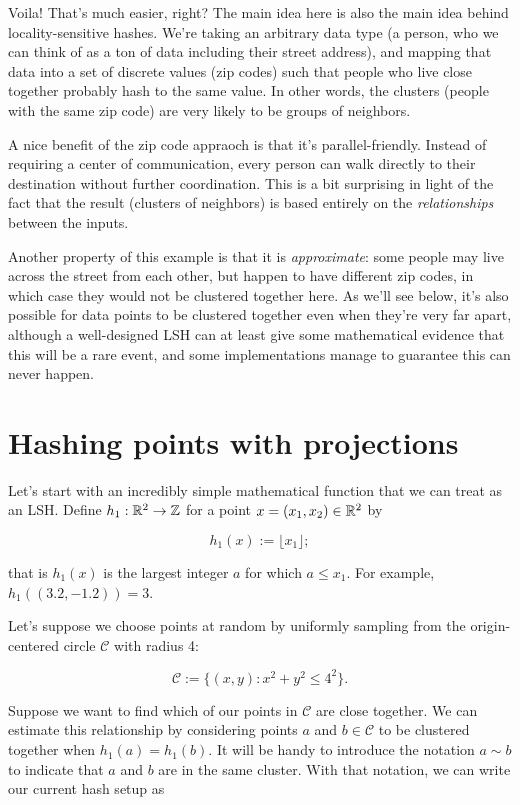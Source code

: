 \documentclass[20pt,]{extarticle}
\begin{document}
Voila! That's much easier, right? The main idea here is also the main
idea behind locality-sensitive hashes. We're taking an arbitrary data
type (a person, who we can think of as a ton of data including their
street address), and mapping that data into a set of discrete values
(zip codes) such that people who live close together probably hash to
the same value. In other words, the clusters (people with the same zip
code) are very likely to be groups of neighbors.

A nice benefit of the zip code appraoch is that it's parallel-friendly.
Instead of requiring a center of communication, every person can walk
directly to their destination without further coordination. This is a
bit surprising in light of the fact that the result (clusters of
neighbors) is based entirely on the \emph{relationships} between the
inputs.

Another property of this example is that it is \emph{approximate}: some
people may live across the street from each other, but happen to have
different zip codes, in which case they would not be clustered together
here. As we'll see below, it's also possible for data points to be
clustered together even when they're very far apart, although a
well-designed LSH can at least give some mathematical evidence that this
will be a rare event, and some implementations manage to guarantee this
can never happen.

\section{Hashing points with
projections}\label{hashing-points-with-projections}

Let's start with an incredibly simple mathematical function that we can
treat as an LSH. Define \(h_1:\mathbb{R}^2 \to \mathbb{Z}\) for a point
\(x=(x_1, x_2)\in\mathbb{R}^2\) by

\[ h_1(x) := \lfloor x_1 \rfloor; \]

that is \(h_1(x)\) is the largest integer \(a\) for which \(a\le x_1.\)
For example, \(h_1((3.2, -1.2)) = 3.\)

Let's suppose we choose points at random by uniformly sampling from the
origin-centered circle \(\mathcal C\) with radius 4:

\[ \mathcal C := \{ (x, y) : x^2 + y^2 \le 4^2 \}. \]

Suppose we want to find which of our points in \(\mathcal C\) are close
together. We can estimate this relationship by considering points \(a\)
and \(b \in \mathcal C\) to be clustered together when
\(h_1(a) = h_1(b).\) It will be handy to introduce the notation
\(a \sim b\) to indicate that \(a\) and \(b\) are in the same cluster.
With that notation, we can write our current hash setup as
\end{document}
